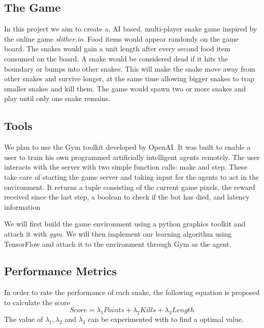 \documentclass[conference]{IEEEtran}
\begin{document}
\subsection*{The Game}
In this project we aim to create a, AI based, multi-player snake game inspired by the online game \textit{slither.io}. Food items would appear randomly on the game board. The snakes would gain a unit length after every second food item consumed on the board. A snake would be considered dead if it hits the boundary or bumps into other snakes. This will make the snake move away from other snakes and survive longer, at the same time allowing bigger snakes to trap smaller snakes and kill them. The game would spawn two or more snakes and play until only one snake remains.\newline\par

\subsection{Tools}
We plan to use the Gym toolkit developed by OpenAI\cite{n1}. It was built to enable a user to train his own programmed artificially intelligent agents remotely. The user interacts with the server with two simple function calls: make and step. These take care of starting the game server and taking input for the agents to act in the environment. It returns a tuple consisting of the current game pixels, the reward received since the last step, a boolean to check if the bot has died, and latency information
\newline\par
We will first build the game environment using a python graphics toolkit and attach it with \textit{gym}. We will then implement our learning algorithm using TensorFlow\cite{n2} and attach it to the environment through Gym as the agent. \newline\par
\subsection{Performance Metrics}
In order to rate the performance of each snake, the following equation is proposed to calculate the score
\begin{equation}
Score=\lambda_1 Points+ \lambda_2 Kills+\lambda_3Length
\end{equation}
The value of \({\lambda_1,\lambda_2}\) and \({\lambda_3}\) can be experimented with to find a optimal value.
\end{document}
